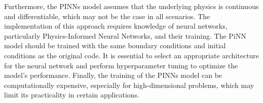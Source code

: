 Furthermore, the PINNs model assumes that the underlying physics is continuous and differentiable, which may not be the case in all scenarios. The implementation of this approach requires knowledge of neural networks, particularly Physics-Informed Neural Networks, and their training. The PiNN model should be trained with the same boundary conditions and initial conditions as the original code. It is essential to select an appropriate architecture for the neural network and perform hyperparameter tuning to optimize the model's performance. Finally, the training of the PINNs model can be computationally expensive, especially for high-dimensional problems, which may limit its practicality in certain applications.